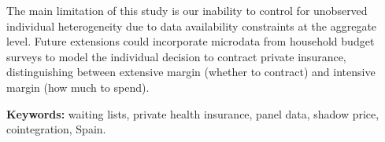 \documentclass[12pt, a4paper, twoside]{report}
\begin{document}
The main limitation of this study is our inability to control for unobserved individual heterogeneity due to data availability constraints at the aggregate level. Future extensions could incorporate microdata from household budget surveys to model the individual decision to contract private insurance, distinguishing between extensive margin (whether to contract) and intensive margin (how much to spend).

\medskip
\noindent\textbf{Keywords:} waiting lists, private health insurance, panel data, shadow price, cointegration, Spain.
\end{document}
